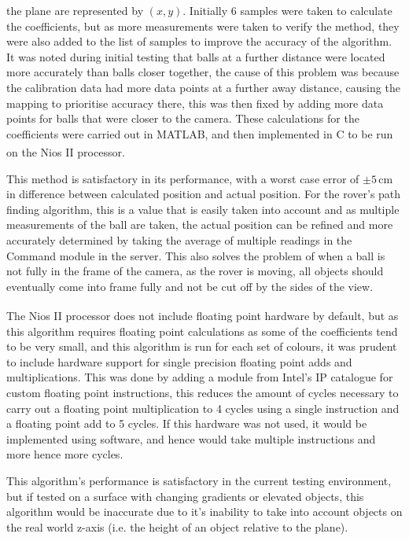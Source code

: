 \documentclass[a4paper]{article}
\newcommand{\unit}[1]{\ensuremath{\, \mathrm{#1}}}
\begin{document}
the plane are represented by \((x,y)\). Initially 6 samples were taken to calculate 
the coefficients, but as more measurements were taken to verify the method, they
were also added to the list of samples to improve the accuracy of the algorithm.
It was noted during initial testing that balls at a further distance were located
more accurately than balls closer together, the cause of this problem was because
the calibration data had more data points at a further away distance, causing the mapping
to prioritise accuracy there, this was then fixed by adding more data points for 
balls that were closer to the camera. 
These calculations for the coefficients were carried out in MATLAB, and then 
implemented in C to be run on the Nios\textsuperscript{\textregistered} II processor. 

This method is satisfactory in its performance, with a worst case error of \(\pm5\unit{cm}\)
in difference between calculated position and actual position. For the rover's 
path finding algorithm, this is a value that is easily taken into account and as
multiple measurements of the ball are taken, the actual position can be refined 
and more accurately determined by taking the average of multiple readings in the 
Command module in the server. This also solves the problem of when a ball is not 
fully in the frame of the camera, as the rover is moving, all objects should eventually
come into frame fully and not be cut off by the sides of the view. 

The Nios\textsuperscript{\textregistered} II processor does not include floating point hardware by default, but as 
this algorithm requires floating point calculations as some of the coefficients 
tend to be very small, and this algorithm is run for each set of colours, it was
prudent to include hardware support for single precision floating point adds 
and multiplications. This was done by adding a module from Intel's IP catalogue 
for custom floating point instructions, this reduces the amount of cycles 
necessary to carry out a floating point multiplication to 4 cycles using a single
instruction and a floating point add to 5 cycles\cite{NiosIICustomInstruction}.
If this hardware was not used, it would be implemented using software, and hence
would take multiple instructions and more hence more cycles. 

This algorithm's performance is satisfactory in the current testing environment, 
but if tested on a surface with changing gradients or elevated objects, this algorithm
would be inaccurate due to it's inability to take into account objects on the real
world z-axis (i.e. the height of an object relative to the plane).
\end{document}
